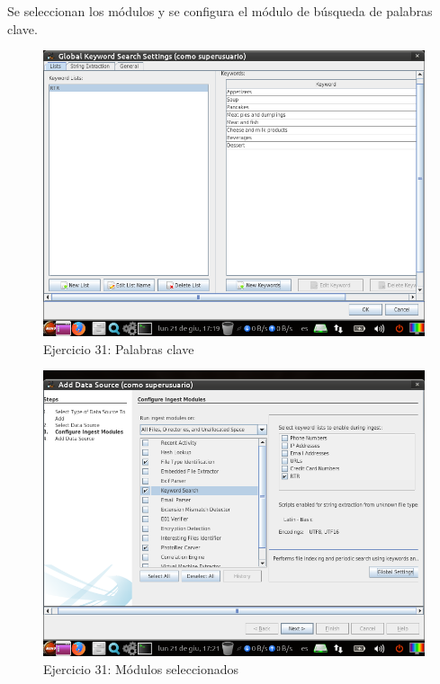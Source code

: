 \documentclass[11pt]{article}
\begin{document}
Se seleccionan los módulos y se configura el módulo de búsqueda de palabras clave.

\begin{figure}[H]
    \caption{Ejercicio 31: Palabras clave}
  \centering
  \includegraphics[scale=0.7]{e31-3.png}
\end{figure}

\begin{figure}[H]
    \caption{Ejercicio 31: Módulos seleccionados}
  \centering
  \includegraphics[scale=0.7]{e31-4.png}
\end{figure}
\end{document}
